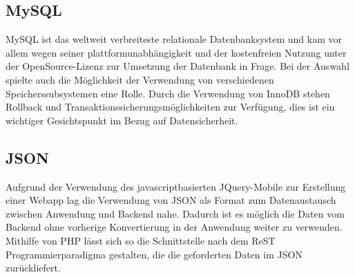 \documentclass[10pt, conference, compsocconf]{IEEEtran}
\begin{document}
\subsection{MySQL}
MySQL ist das weltweit verbreiteste relationale Datenbanksystem und kam vor allem wegen seiner plattformunabh\"angigkeit und der kostenfreien Nutzung unter der OpenSource-Lizenz zur Umsetzung der Datenbank in Frage. Bei der Auswahl spielte auch die M\"oglichkeit der Verwendung von verschiedenen Speicherssubsystemen eine Rolle. Durch die Verwendung von InnoDB stehen Rollback und Transaktionssicherungsm\"oglichkeiten zur Verf\"ugung, dies ist ein wichtiger Gesichtspunkt im Bezug auf Datensicherheit.

\subsection{JSON}
Aufgrund der Verwendung des javascriptbasierten JQuery-Mobile zur Erstellung einer Webapp lag die Verwendung von JSON als Format zum Datenaustausch zwischen Anwendung und Backend nahe. Dadurch ist es m\"oglich die Daten vom Backend ohne vorherige Konvertierung in der Anwendung weiter zu verwenden. Mithilfe von PHP l\"asst sich so die Schnittstelle nach dem ReST Programmierparadigma gestalten, die die geforderten Daten im JSON zur\"uckliefert. 
\end{document}
